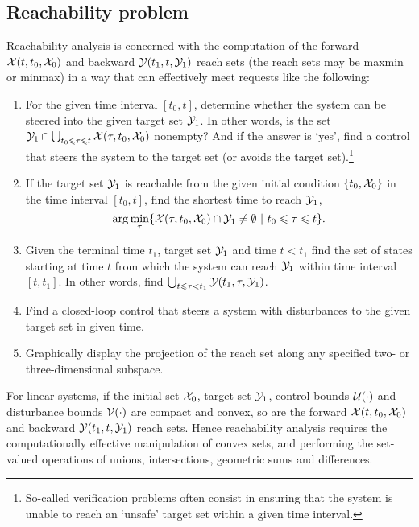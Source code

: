 \subsection{Reachability problem}
Reachability analysis is concerned with the computation of the forward
$\XX(t, t_0, \XX_0)$ and backward  $\YY(t_1, t, \YY_1)$ reach sets (the
reach sets may  be maxmin or minmax)
in a way that can effectively meet requests like the following:
\begin{enumerate}
\item For the given time interval $[t_0, t]$, 
determine whether the system can be steered into the given target set $\YY_1$.
In other words, is the set
$\YY_1\cap\bigcup_{t_0 \leq\tau\leq t}\XX(\tau, t_0, \XX_0)$ nonempty?
And if the answer is `yes', find a  control that steers the system to the target set (or avoids the target set).\footnote{So-called verification problems often consist in ensuring
 that the system is unable to reach an `unsafe' target set within a given
time interval.}

\item If the target set $\YY_1$ is reachable from the given initial
condition $\{t_0, \XX_0\}$ in the time interval $[t_0, t]$,
find the shortest time to reach $\YY_1$,
\[ \arg\min_{\tau}
\{\XX(\tau,t_0,\XX_0)\cap\YY_1\neq\emptyset ~|~ t_0\leq\tau\leq t\}. \]

\item Given the terminal time $t_1$, target set $\YY_1$ and time $t<t_1$
find the set of states starting at time $t$ from which  the system can reach
$\YY_1$ within time interval $[t, t_1]$.
In other words, find $\bigcup_{t\leq\tau<t_1}\YY(t_1, \tau, \YY_1)$.

\item Find a closed-loop control that steers a system with disturbances
to the given target set in given time.

\item Graphically display the projection of the reach set along any
specified two- or three-dimensional subspace.
\end{enumerate}
For linear systems, if the initial set $\XX_0$, target set $\YY_1$, control
bounds $\UU(\cdot)$ and disturbance bounds $\VV(\cdot)$ are compact and convex,
so are the forward $\XX(t, t_0, \XX_0)$ and backward $\YY(t_1, t, \YY_1)$
reach sets.
Hence reachability analysis requires the computationally effective manipulation
of convex sets, and performing the set-valued operations of unions,
intersections, geometric sums and differences.

